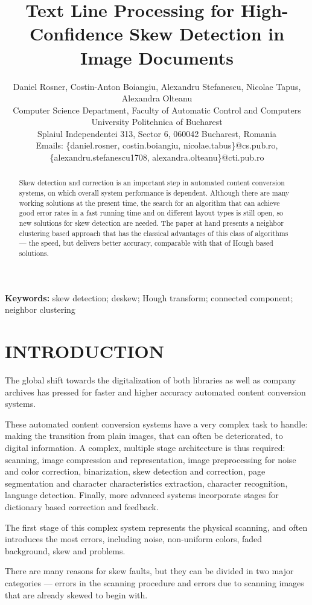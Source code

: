 \documentclass[10pt,a4paper]{article}
\title{Text Line Processing for High-Confidence Skew Detection in Image Documents}
\author{Daniel Rosner, Costin-Anton Boiangiu, Alexandru Stefanescu, Nicolae Tapus, Alexandra Olteanu \\
	Computer Science Department, Faculty of Automatic Control and Computers \\
	University Politehnica of Bucharest \\
	Splaiul Independentei 313, Sector 6, 060042 Bucharest, Romania \\
	Emails: \{daniel.rosner, costin.boiangiu, nicolae.tabus\}@cs.pub.ro, \\
	\{alexandru.stefanescu1708, alexandra.olteanu\}@cti.pub.ro}
\begin{document}
	
	\maketitle
	
	\begin{abstract}
		Skew detection and correction is an important step in automated content conversion systems, on which overall system performance is dependent. Although there are many working solutions at the present time, the search for an algorithm that can achieve good error rates in a fast running time and on different layout types is still open, so new solutions for skew detection are needed. The paper at hand presents a neighbor clustering based approach that has the classical advantages of this class of algorithms — the speed, but delivers better accuracy, comparable with that of Hough based solutions.
	\end{abstract}
	
	\textbf{Keywords:} skew detection; deskew; Hough transform; connected component; neighbor clustering
	
	\section{INTRODUCTION}
	The global shift towards the digitalization of both libraries as well as company archives has pressed for faster and higher accuracy automated content conversion systems.
	
	These automated content conversion systems have a very complex task to handle: making the transition from plain images, that can often be deteriorated, to digital information. A complex, multiple stage architecture is thus required: scanning, image compression and representation, image preprocessing for noise and color correction, binarization, skew detection and correction, page segmentation and character characteristics extraction, character recognition, language detection. Finally, more advanced systems incorporate stages for dictionary based correction and feedback.
	
	The first stage of this complex system represents the physical scanning, and often introduces the most errors, including noise, non-uniform colors, faded background, skew and problems.
	
	There are many reasons for skew faults, but they can be divided in two major categories — errors in the scanning procedure and errors due to scanning images that are already skewed to begin with.
	
\end{document}
